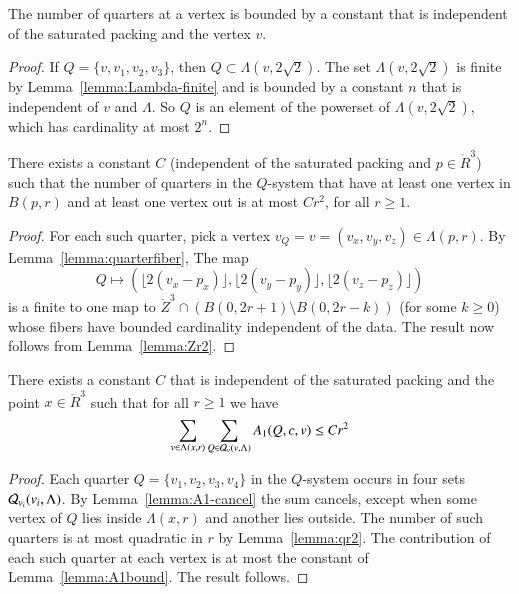 \begin{lemma} \label{lemma:quarterfiber}
The number of quarters at a vertex is bounded by a constant that
is independent of the saturated packing and the vertex $v$.
\end{lemma}

\begin{proof}  If $Q=\{v,v_1,v_2,v_3\}$, then $Q\subset
\Lambda(v,2\sqrt2)$.  The set $\Lambda(v,2\sqrt2)$ is finite by
Lemma~\ref{lemma:Lambda-finite} and is bounded by a constant $n$
that is independent of $v$ and $\Lambda$.  So $Q$ is an element of
the powerset of $\Lambda(v,2\sqrt2)$, which has cardinality at
most $2^n$.
\end{proof}

\begin{lemma}\label{lemma:qr2} There exists a constant $C$ (independent of the
saturated packing and $p\in\ring{R}^3$) such that the number of
quarters in the $Q$-system that have at least one vertex in
$B(p,r)$ and at least one vertex out is at most $C r^2$, for all
$r\ge 1$.
\end{lemma}

\begin{proof}  For each such quarter, pick a vertex $v_Q=v=(v_x,v_y,v_z)\in
\Lambda(p,r)$.  By Lemma~\ref{lemma:quarterfiber}, The map
    $$
    Q\mapsto (\lfloor 2(v_x-p_x)\rfloor, \lfloor
    2(v_y-p_y)\rfloor,\lfloor 2(v_z-p_z)\rfloor)
    $$
is a finite to one map to $\ring{Z}^3 \cap ( B(0,2r+1) \setminus
B(0,2r-k))$ (for some $k\ge 0$) whose fibers have bounded
cardinality independent of the data.  The result now follows from
Lemma~\ref{lemma:Zr2}.
\end{proof}

\begin{lemma}\label{lemma:negA1} There exists a constant $C$ that is independent of
the saturated packing and the point $x\in\ring{R}^3$ such that for
all $r\ge 1$ we have
$$\sum_{v\in\Lambda(x,r)} \sum_{Q\in{\mathcal Q}_v(v,\Lambda)}
      A_1 (Q,c,v) \le C r^2$$
\end{lemma}

\begin{proof}
Each quarter $Q=\{v_1,v_2,v_3,v_4\}$ in the $Q$-system occurs in
four sets ${\mathcal Q}_{v_i}(v_i,\Lambda)$.  By
Lemma~\ref{lemma:A1-cancel} the sum cancels, except when some
vertex of $Q$ lies inside $\Lambda(x,r)$ and another lies outside.
The number of such quarters is at most quadratic in $r$ by
Lemma~\ref{lemma:qr2}.  The contribution of each such quarter at
each vertex is at most the constant of Lemma~\ref{lemma:A1bound}.
The result follows.
\end{proof}


